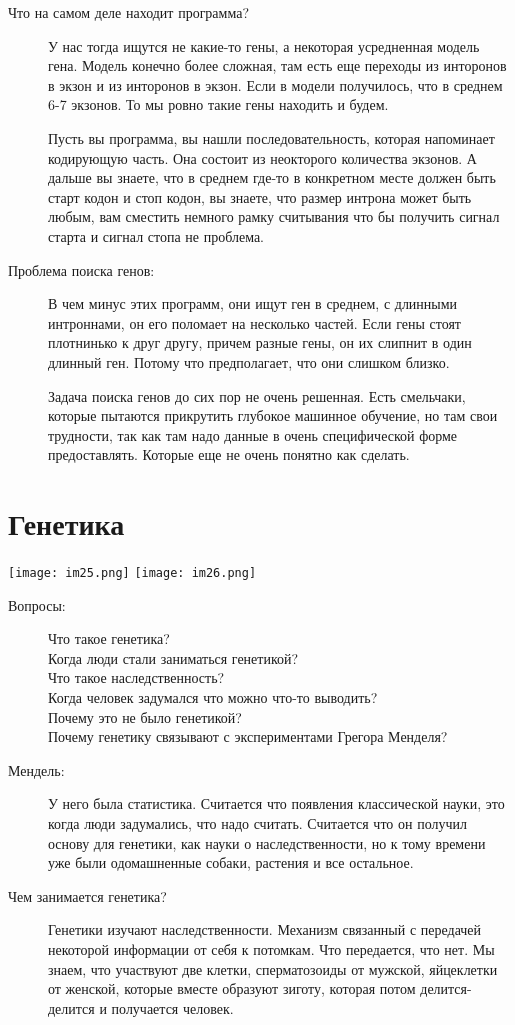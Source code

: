 \begin{description}
\begin{description}
\item[Что на самом деле находит программа?]
У нас тогда ищутся не какие-то гены, а некоторая 
усредненная модель гена. Модель конечно более сложная, 
там есть еще переходы из инторонов в экзон и из 
инторонов в экзон. Если в модели получилось, что 
в среднем 6-7 экзонов. То мы ровно такие гены находить и будем. 

Пусть вы программа, вы нашли последовательность, которая 
напоминает кодирующую часть. Она состоит из неокторого 
количества экзонов. А дальше вы знаете, что 
в среднем где-то в конкретном месте должен быть старт кодон и стоп
кодон, вы знаете, что размер интрона может быть 
любым, вам сместить немного рамку считывания что бы 
получить сигнал старта и сигнал стопа не проблема. 

\item[Проблема поиска генов:]
В чем минус этих программ, они ищут ген в среднем, с длинными 
интроннами, он его поломает на несколько частей. Если гены 
стоят плотнинько к друг другу, причем разные гены, он 
их слипнит в один длинный ген. Потому что предполагает, что они слишком близко. 

Задача поиска генов до сих пор не очень решенная. Есть смельчаки, 
которые пытаются прикрутить глубокое машинное обучение, но 
там свои трудности, так как там надо данные в очень специфической форме 
предоставлять. Которые еще не очень понятно как сделать.  
\end{description}
\end{description}

\section{Генетика}
\texttt{[image: im25.png]}
\texttt{[image: im26.png]}

\begin{description}
\item[Вопросы:]
Что такое генетика?\\
Когда люди стали заниматься генетикой?\\ 
Что такое наследственность?\\
Когда человек задумался что можно что-то выводить?\\ 
Почему это не было генетикой?\\
Почему генетику связывают с экспериментами Грегора Менделя? 
\item[Мендель:]
У него была статистика. Считается что появления классической науки, это
когда люди задумались, что надо считать. Считается что он получил основу для генетики, как науки о наследственности, 
но к тому времени уже были одомашненные собаки, растения и все остальное. 

\item[Чем занимается генетика?]
Генетики изучают наследственности. Механизм связанный с передачей некоторой информации
от себя к потомкам. Что передается, что нет. Мы знаем, что участвуют две клетки, сперматозоиды от мужской, 
яйцеклетки от женской, которые вместе образуют зиготу, которая потом 
делится-делится и получается человек.  
\end{description}

